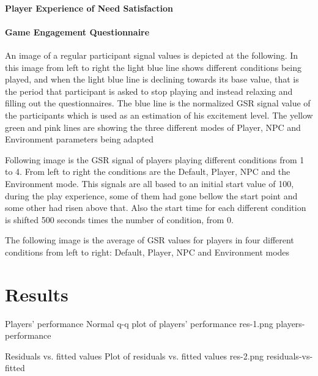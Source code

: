 \paragraph{Player Experience of Need Satisfaction}


\paragraph{Game Engagement Questionnaire}

An image of a regular participant signal values is depicted at
the following. In this image from left to right the light blue line
shows different conditions being played, and when the light blue
line is declining towards its base value, that is the period that
participant is asked to stop playing and instead relaxing and filling
out the questionnaires. The blue line is the normalized GSR signal
value of the participants which is used as an estimation of his
excitement level. The yellow green and pink lines are showing the
three different modes of Player, NPC and Environment parameters
being adapted

Following image is the GSR signal of players playing different
conditions from 1 to 4. From left to right the conditions are the
Default, Player, NPC and the Environment mode. This signals are all
based to an initial start value of 100, during the play experience,
some of them had gone bellow the start point and some other had risen
above that. Also the start time for each different condition is
shifted 500 seconds times the number of condition, from 0.

The following image is the average of GSR values for players in four
different conditions from left to right: Default, Player, NPC and
Environment modes

\section{Results}


\img
{Players' performance}
{Normal q-q plot of players' performance}
{res-1.png}
{players-performance}

\img
{Residuals vs. fitted values}
{Plot of residuals vs. fitted values}
{res-2.png}
{residuals-vs-fitted}

